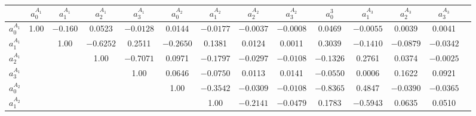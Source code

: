 \documentclass[aps,superscriptaddress,showpacs,nofootinbib,11pt]{revtex4-1}
\newcommand\tstrut{\rule{0pt}{2.9ex}}       %
\begin{document}
%
\begin{table}[h]
\begin{ruledtabular}
\begin{center}
\begin{tabular}{cccccccccccccc}
 & $a_0^{{A_1}}$&$a_1^{{A_1}}$&$a_2^{{A_1}}$&$a_3^{{A_1}}$
& $a_0^{{A_2}}$&$a_1^{{A_2}}$&$a_2^{{A_2}}$&$a_3^{{A_2}}$& $a_0^{{3}}$&$a_1^{{A_3}}$&$a_2^{{A_3}}$&$a_3^{{A_3}}$\\ \hline \tstrut
$a_0^{{A_1}}$&   1.00  & $-0.160$&  \hspace{.25cm}0.0523 & $-0.0128$  & \hspace{.25cm}0.0144 & $-0.0177$ & $-0.0037$ & $-0.0008$  & \hspace{.25cm}0.0469  &$-0.0055$ &  \hspace{.25cm}0.0039  & \hspace{.25cm}0.0041 \\
$a_1^{{A_1}}$&   &   1.00&  $-0.6252$&   \hspace{.25cm}0.2511 & $-0.2650$&   \hspace{.25cm}0.1381&   \hspace{.25cm}0.0124&   \hspace{.25cm}0.0011 &  \hspace{.25cm}0.3039 & $-0.1410$&  $-0.0879$ & $-0.0342$\\
$a_2^{{A_1}}$&   &&   1.00&  $-0.7071$ &  \hspace{.25cm}0.0971&  $-0.1797$&  $-0.0297$&  $-0.0108$ & $-0.1326$ &  \hspace{.25cm}0.2761&   \hspace{.25cm}0.0374 & $-0.0025$ \\
$a_3^{{A_1}}$&   &&&   1.00 &  \hspace{.25cm}0.0646&  $-0.0750$&   \hspace{.25cm}0.0113&   \hspace{.25cm}0.0141 & $-0.0550$ &  \hspace{.25cm}0.0006&   \hspace{.25cm}0.1622 &  \hspace{.25cm}0.0921\\
$a_0^{{A_2}}$&  &&&&  1.00&  $-0.3542$&  $-0.0309$&  $-0.0108$ & $-0.8365$ &  \hspace{.25cm}0.4847&  $-0.0390$ & $-0.0365$ \\
$a_1^{{A_2}}$&   &&&&&   1.00&  $-0.2141$&  $-0.0479$ &  \hspace{.25cm}0.1783 & $-0.5943$&   \hspace{.25cm}0.0635 &  \hspace{.25cm}0.0510\\

\end{tabular}
\end{center}
\end{ruledtabular}
\end{table}
\end{document}
